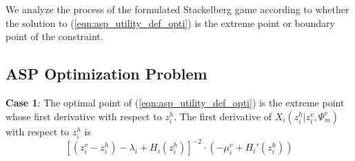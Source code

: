 \documentclass[10pt,journal, compsoc]{IEEEtran}
\begin{document}
We analyze the process of the formulated Stackelberg game according to whether the solution to (\ref{eqn:asp_utility_def_opti}) is the extreme point or boundary point of the constraint.

\subsection{ASP Optimization Problem}
\textbf{Case 1}: The optimal point of (\ref{eqn:asp_utility_def_opti}) is the extreme point whose first derivative with respect to $z_i^h$. The first derivative of $X_i(z_i^h|z_i^v,\Psi_m^v)$ with respect to $z_i^h$ is
\begin{equation} \label{eqn:asp_utilitu_def_firstderiv}
[(z_i^v - z_i^h) - \lambda_i + H_i(z_i^h)]^{-2} \cdot (-\mu_i^v + H_i'(z_i^h))
\end{equation}
\end{document}
